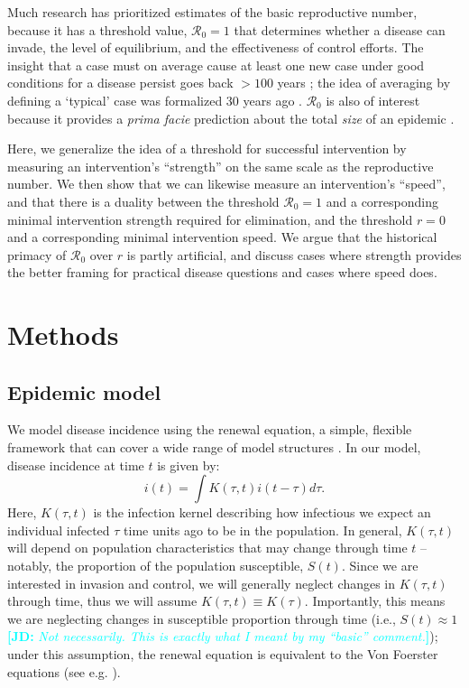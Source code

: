 \documentclass[12pt]{article}
\newcommand{\comment}[3]{\textcolor{#1}{\textbf{[#2: }\textit{#3}\textbf{]}}}
\newcommand{\jd}[1]{\comment{cyan}{JD}{#1}}
\newcommand{\RR}{\ensuremath{{\mathcal R}}}
\begin{document}
Much research has prioritized estimates of the basic reproductive number, because it has a threshold value, $\RR_0=1$ that determines whether a disease can invade, the level of equilibrium, and the effectiveness of control efforts.
The insight that a case must on average cause at least one new case under good conditions for a disease persist goes back $>100$ years \citep{ross1911prevention};
the idea of averaging by defining a `typical' case was formalized 30 years ago \citep{diekmann1990definition}.
$\RR_0$ is also of interest because it provides a \emph{prima facie} prediction about the total \emph{size} of an epidemic \citep{anderson1991infectious, ma2006generality, arino2007final, andreasen2011final, miller2012note}.

Here, we generalize the idea of a threshold for successful intervention by measuring an intervention's ``strength'' on the same scale as the reproductive number. 
We then show that we can likewise measure an intervention's ``speed'', and that there is a duality between the threshold $\RR_0=1$ and a corresponding minimal intervention strength required for elimination, and the threshold $r=0$ and a corresponding minimal intervention speed. 
We argue that the historical primacy of $\RR_0$ over $r$ is partly artificial, and discuss cases where strength provides the better framing for practical disease questions and cases where speed does.

\section{Methods}

\subsection{Epidemic model}

We model disease incidence using the renewal equation, a simple, flexible framework that can cover a wide range of model structures \citep{heesterbeek1996concept, diekmann2000mathematical, roberts2004modelling, aldis2005integral, wallinga2007generation, roberts2007model, Champredon2018equivalence}.
In our model, disease incidence at time $t$ is given by:
\begin{equation}
i(t) = \int K(\tau, t) i(t-\tau) d\tau.
\end{equation}
Here, $K(\tau, t)$ is the infection kernel describing how infectious we expect an individual infected $\tau$ time units ago to be in the population.
In general, $K(\tau, t)$ will depend on population characteristics that may change through time $t$ -- notably, the proportion of the population susceptible, $S(t)$.
Since we are interested in invasion and control, we will generally neglect changes in $K(\tau, t)$ through time, thus we will assume $K(\tau, t) \equiv K(\tau)$.
Importantly, this means we are neglecting changes in susceptible proportion through time (i.e., $S(t) \approx 1$ \jd{Not necessarily. This is exactly what I meant by my ``basic'' comment.});
under this assumption, the renewal equation is equivalent to the Von Foerster equations (see e.g. \cite{fraser2004factors}).
\end{document}
